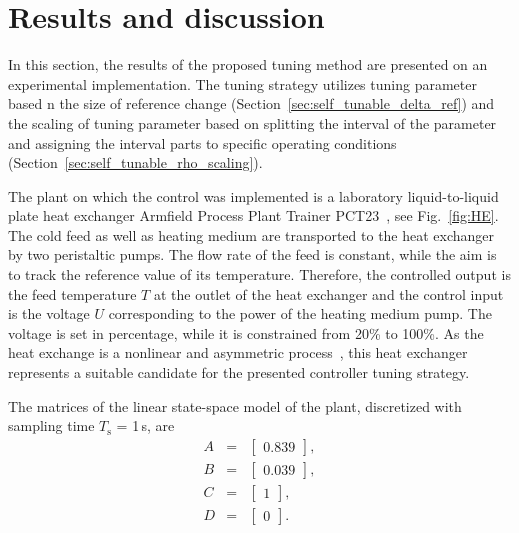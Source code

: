 \documentclass[preprint,12pt]{elsarticle}
\begin{document}
\section{Results and discussion}
\label{sec:results}

In this section, the results of the proposed tuning method are presented on an experimental implementation. The tuning strategy utilizes tuning parameter based n the size of reference change (Section~\ref{sec:self_tunable_delta_ref}) and the scaling of tuning parameter based on splitting the interval of the parameter and assigning the interval parts to specific operating conditions (Section~\ref{sec:self_tunable_rho_scaling}).

The plant on which the control was implemented is a laboratory liquid-to-liquid plate heat exchanger Armfield Process Plant Trainer PCT23~\cite{pct23}, see Fig.~\ref{fig:HE}. The cold feed as well as heating medium are transported to the heat exchanger by two peristaltic pumps. The flow rate of the feed is constant, while the aim is to track the reference value of its temperature. Therefore, the controlled output is the feed temperature $T$ at the outlet of the heat exchanger and the control input is the voltage $U$ corresponding to the power of the heating medium pump. The voltage is set in percentage, while it is constrained from 20\% to 100\%. As the heat exchange is a nonlinear and asymmetric process~\cite{Liptak}, this heat exchanger represents a suitable candidate for the presented controller tuning strategy.  

The matrices of the linear state-space model of the plant, discretized with sampling time $T_\mathrm{s}$ = 1\,s, are
\begin{subequations}
	\label{eq:model_A_B} 
	\begin{eqnarray}
		A&=&\begin{bmatrix}
			0.839
		\end{bmatrix}, \\
		B&=&\begin{bmatrix}
			0.039
		\end{bmatrix}, \\
		C&=&\begin{bmatrix}
			1
		\end{bmatrix}, \\
		D&=&\begin{bmatrix}
			0
		\end{bmatrix}.
		\end{eqnarray}
\end{subequations}
\end{document}
